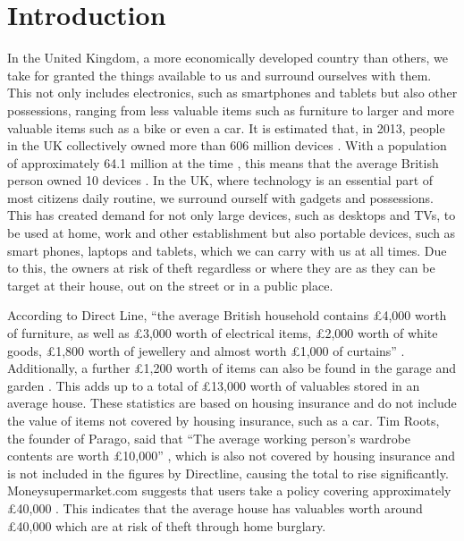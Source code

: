 \section{Introduction}
In the United Kingdom, a more economically developed country than others, we take for granted the things available to us and surround ourselves with them. This not only includes electronics, such as smartphones and tablets but also other possessions, ranging from less valuable items such as furniture to larger and more valuable items such as a bike or even a car. It is estimated that, in 2013, people in the UK collectively owned more than 606 million devices \cite{Telegraph:GadgetsPerBrit}. With a population of approximately 64.1 million at the time \cite{WorldBank:UKPopulation2013}, this means that the average British person owned 10 devices \cite{Telegraph:GadgetsPerBrit}. In the UK, where technology is an essential part of most citizens daily routine, we surround ourself with gadgets and possessions. This has created demand for not only large devices, such as desktops and TVs, to be used at home, work and other establishment but also portable devices, such as smart phones, laptops and tablets, which we can carry with us at all times. Due to this, the owners at risk of theft regardless or where they are as they can be target at their house, out on the street or in a public place.

According to Direct Line, ``the average British household contains \pounds4,000 worth of furniture, as well as \pounds3,000 worth of electrical items, \pounds2,000 worth of white goods, \pounds1,800 worth of jewellery and almost worth \pounds1,000 of curtains'' \cite{Telegraph:ContentsValue}. Additionally, a further \pounds1,200 worth of items can also be found in the garage and garden \cite{Telegraph:ContentsValue}. This adds up to a total of \pounds13,000 worth of valuables stored in an average house. These statistics are based on housing insurance and do not include the value of items not covered by housing insurance, such as a car. Tim Roots, the founder of Parago, said that ``The average working person's wardrobe contents are worth \pounds10,000'' \cite{Telegraph:ContentsValue}, which is also not covered by housing insurance and is not included in the figures by Directline, causing the total to rise significantly. Moneysupermarket.com suggests that users take a policy covering approximately \pounds40,000 \cite{Telegraph:ContentsValue}. This indicates that the average house has valuables worth around \pounds40,000 which are at risk of theft through home burglary. 

